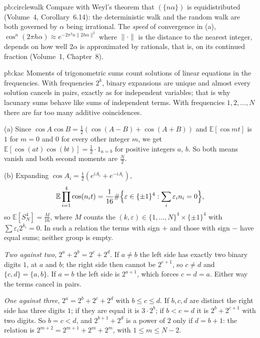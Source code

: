 \begin{solution}{pb:circlewalk}
\leads Compare with Weyl's theorem that $(\{n\alpha\})$ is equidistributed (Volume~4, Corollary~6.14): the deterministic walk and the random walk
are both governed by $\alpha$ being irrational. The \emph{speed} of convergence in (a), $\cos^n(2\pi h\alpha)\approx e^{-2\pi^2n\|2h\alpha\|^2}$ where $\|\cdot\|$ is the
distance to the nearest integer, depends on how well $2\alpha$ is approximated by rationals, that is, on its continued fraction (Volume~1,
Chapter~8).
\end{solution}

\begin{solution}{pb:kac}
\idea Moments of trigonometric sums count solutions of linear equations in the frequencies. With frequencies $2^k$, binary
expansions are unique and almost every solution cancels in pairs, exactly as for independent variables; that is why lacunary sums
behave like sums of independent terms. With frequencies $1,2,\dots,N$ there are far too many additive coincidences.

\writeup (a) Since $\cos A\cos B=\frac12(\cos(A-B)+\cos(A+B))$ and $\mathbb E[\cos mt]$ is $1$ for $m=0$ and $0$ for every other integer $m$, we get
$\mathbb E[\cos(at)\cos(bt)]=\frac12\cdot1_{a=b}$ for positive integers $a$, $b$. So both means vanish and both second moments are $\frac N2$.

(b) Expanding $\cos A_i=\frac12(e^{iA_i}+e^{-iA_i})$,
\[
\mathbb E\prod_{i=1}^4\cos(n_it)=\frac1{16}\#\Bigl\{\varepsilon\in\{\pm1\}^4:\sum_i\varepsilon_in_i=0\Bigr\},
\]
so $\mathbb E[S_N^4]=\frac M{16}$, where $M$ counts the $(k,\varepsilon)\in\{1,\dots,N\}^4\times\{\pm1\}^4$ with $\sum\varepsilon_i2^{k_i}=0$. In such a relation the terms with sign
$+$ and those with sign $-$ have equal sums; neither group is empty.

\emph{Two against two}, $2^a+2^b=2^c+2^d$. If $a\ne b$ the left side has exactly two binary digits $1$, at $a$ and $b$; the right side
then cannot be $2^{c+1}$, so $c\ne d$ and $\{c,d\}=\{a,b\}$. If $a=b$ the left side is $2^{a+1}$, which forces $c=d=a$. Either way the terms
cancel in pairs.

\emph{One against three}, $2^a=2^b+2^c+2^d$ with $b\le c\le d$. If $b,c,d$ are distinct the right side has three digits $1$; if they are
equal it is $3\cdot2^b$; if $b<c=d$ it is $2^b+2^{c+1}$ with two digits. So $b=c<d$, and $2^{b+1}+2^d$ is a power of $2$ only if $d=b+1$: the
relation is $2^{m+2}=2^{m+1}+2^m+2^m$, with $1\le m\le N-2$.


\end{solution}
